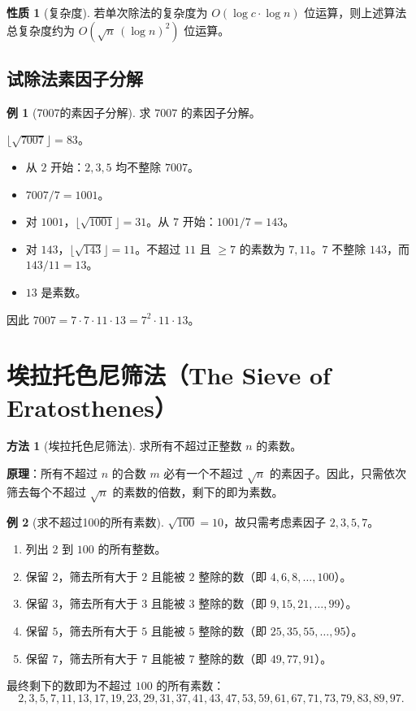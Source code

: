 \documentclass[UTF8,11pt,a4paper]{ctexbook}   %
\theoremstyle{definition}
\newtheorem{example}{例}[section]
\newtheorem{property}{性质}[section]
\newtheorem{method}{方法}[section]
\begin{document}
\begin{property}[复杂度]
若单次除法的复杂度为 $O(\log c\cdot\log n)$ 位运算，则上述算法总复杂度约为 $O(\sqrt{n}\,(\log n)^2)$ 位运算。
\end{property}

\subsection{试除法素因子分解}

\begin{example}[7007的素因子分解]
求 $7007$ 的素因子分解。

$\lfloor\sqrt{7007}\rfloor=83$。
\begin{itemize}
    \item 从 $2$ 开始：$2,3,5$ 均不整除 $7007$。
    \item $7007/7 = 1001$。
    \item 对 $1001$，$\lfloor\sqrt{1001}\rfloor=31$。从 $7$ 开始：$1001/7 = 143$。
    \item 对 $143$，$\lfloor\sqrt{143}\rfloor=11$。不超过 $11$ 且 $\ge 7$ 的素数为 $7,11$。$7$ 不整除 $143$，而 $143/11 = 13$。
    \item $13$ 是素数。
\end{itemize}
因此 $7007 = 7\cdot 7\cdot 11\cdot 13 = 7^2\cdot 11\cdot 13$。
\end{example}

\section{埃拉托色尼筛法（The Sieve of Eratosthenes）}

\begin{method}[埃拉托色尼筛法]
求所有不超过正整数 $n$ 的素数。

\textbf{原理}：所有不超过 $n$ 的合数 $m$ 必有一个不超过 $\sqrt{n}$ 的素因子。因此，只需依次筛去每个不超过 $\sqrt{n}$ 的素数的倍数，剩下的即为素数。
\end{method}

\begin{example}[求不超过100的所有素数]
$\sqrt{100}=10$，故只需考虑素因子 $2,3,5,7$。

\begin{enumerate}
    \item 列出 $2$ 到 $100$ 的所有整数。
    \item 保留 $2$，筛去所有大于 $2$ 且能被 $2$ 整除的数（即 $4,6,8,\dots,100$）。
    \item 保留 $3$，筛去所有大于 $3$ 且能被 $3$ 整除的数（即 $9,15,21,\dots,99$）。
    \item 保留 $5$，筛去所有大于 $5$ 且能被 $5$ 整除的数（即 $25,35,55,\dots,95$）。
    \item 保留 $7$，筛去所有大于 $7$ 且能被 $7$ 整除的数（即 $49,77,91$）。
\end{enumerate}

最终剩下的数即为不超过 $100$ 的所有素数：
\[
2,3,5,7,11,13,17,19,23,29,31,37,41,43,47,53,59,61,67,71,73,79,83,89,97.
\]
\end{example}
\end{document}
